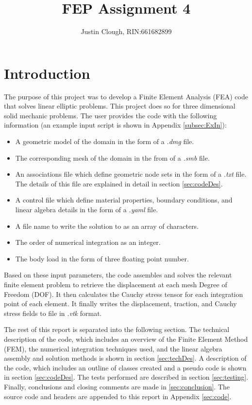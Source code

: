 \documentclass[a4paper, 12pt]{article}
\author{Justin Clough, RIN:661682899}
\title{FEP Assignment 4}
\begin{document}
\maketitle

\newpage
\section{Introduction} \label{sec:intro}
The purpose of this project was to develop a Finite
Element Analysis (FEA) code that solves linear
elliptic problems. This project does so for
three dimensional solid mechanic problems. The user
provides the code with the following information
(an example input script is shown in
Appendix \ref{subsec:ExIn}):

\begin{itemize}
  \item A geometric model of the domain in the
        form of a \emph{.dmg} file.
  \item The corresponding mesh of the domain in the
        from of a \emph{.smb} file.
  \item An associations file which define geometric
        node sets in the form of a \emph{.txt} file. The
        details of this file are explained in detail in
        section \ref{sec:codeDes}.
  \item A control file which define material properties,
        boundary conditions, and linear algebra details in
        the form of a \emph{.yaml} file.
  \item A file name to write the solution to as an array of
        characters.
  \item The order of numerical integration as an integer.
  \item The body load in the form of three floating point
        number.
\end{itemize}

Based on these input parameters, the code assembles and
solves the relevant finite element problem to retrieve
the displacement at each mesh Degree of Freedom (DOF).
It then calculates the Cauchy stress tensor for each
integration point of each element. It finally writes
the displacement, traction, and Cauchy stress fields to
file in \emph{.vtk} format.

The rest of this report is separated into the following
section. The technical description of the code, which
includes an overview of the Finite Element Method (FEM),
the numerical integration techniques used, and the
linear algebra assembly and solution methods is shown in
section \ref{sec:techDes}. A description of the code, which
includes an outline of classes created and a pseudo code
is shown in section \ref{sec:codeDes}. The tests performed
are described in section \ref{sec:testing}. Finally,
conclusions and closing comments are made
in \ref{sec:conclusion}. The source code and headers
are appended to this report in Appendix \ref{sec:code}.
\end{document}
